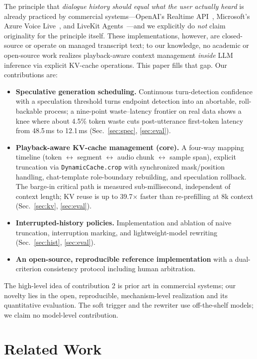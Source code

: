 \documentclass[conference]{IEEEtran}
\begin{document}
The principle that \emph{dialogue history should equal what the user actually heard} is already practiced by commercial systems---OpenAI's Realtime API~\cite{openai_realtime}, Microsoft's Azure Voice Live~\cite{azure_voicelive}, and LiveKit Agents~\cite{livekit_agents}---and we explicitly do \emph{not} claim originality for the principle itself. These implementations, however, are closed-source or operate on managed transcript text; to our knowledge, no academic or open-source work realizes playback-aware context management \emph{inside} LLM inference via explicit KV-cache operations. This paper fills that gap. Our contributions are:
\begin{itemize}
  \item \textbf{Speculative generation scheduling.} Continuous turn-detection confidence with a speculation threshold turns endpoint detection into an abortable, roll-backable process; a nine-point waste--latency frontier on real data shows a knee where about 4.5\% token waste cuts post-utterance first-token latency from 48.5\,ms to 12.1\,ms (Sec.~\ref{sec:spec}, \ref{sec:eval}).
  \item \textbf{Playback-aware KV-cache management (core).} A four-way mapping timeline (token $\leftrightarrow$ segment $\leftrightarrow$ audio chunk $\leftrightarrow$ sample span), explicit truncation via \texttt{DynamicCache.crop} with synchronized mask/position handling, chat-template role-boundary rebuilding, and speculation rollback. The barge-in critical path is measured sub-millisecond, independent of context length; KV reuse is up to 39.7$\times$ faster than re-prefilling at 8k context (Sec.~\ref{sec:kv}, \ref{sec:eval}).
  \item \textbf{Interrupted-history policies.} Implementation and ablation of naive truncation, interruption marking, and lightweight-model rewriting (Sec.~\ref{sec:hist}, \ref{sec:eval}).
  \item \textbf{An open-source, reproducible reference implementation} with a dual-criterion consistency protocol including human arbitration.
\end{itemize}
The high-level idea of contribution 2 is prior art in commercial systems; our novelty lies in the open, reproducible, mechanism-level realization and its quantitative evaluation. The soft trigger and the rewriter use off-the-shelf models; we claim no model-level contribution.

\section{Related Work}
\end{document}
